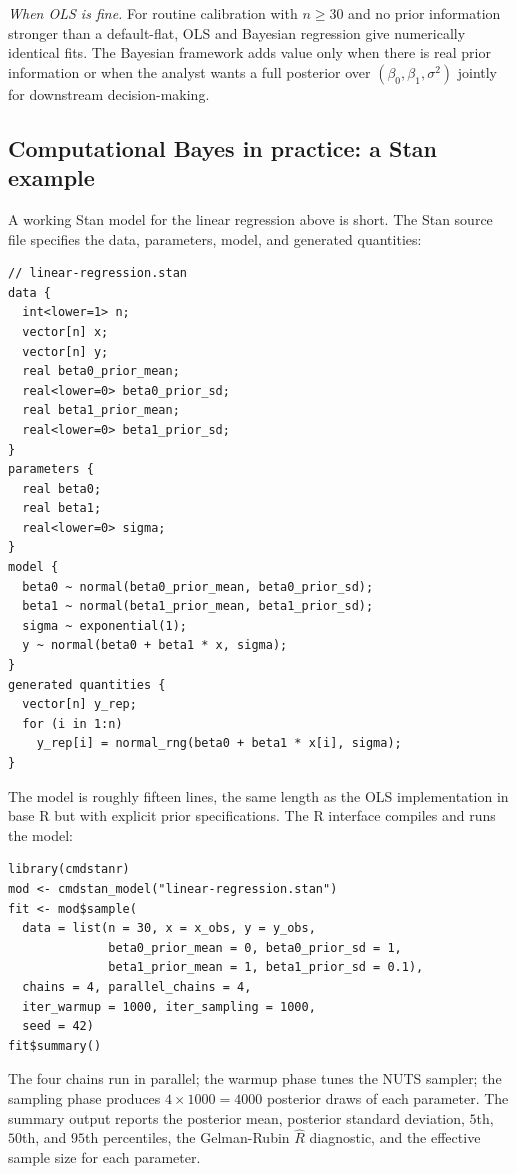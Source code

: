 \textit{When OLS is fine.} For routine calibration with $n \geq
30$ and no prior information stronger than a default-flat,
OLS and Bayesian regression give numerically identical fits.
The Bayesian framework adds value only when there is real prior
information or when the analyst wants a full posterior over
$(\beta_{0}, \beta_{1}, \sigma^{2})$ jointly for downstream
decision-making.

\subsection{Computational Bayes in practice: a Stan example}

A working Stan model for the linear regression above is short.
The Stan source file specifies the data, parameters, model, and
generated quantities:

\begin{verbatim}
// linear-regression.stan
data {
  int<lower=1> n;
  vector[n] x;
  vector[n] y;
  real beta0_prior_mean;
  real<lower=0> beta0_prior_sd;
  real beta1_prior_mean;
  real<lower=0> beta1_prior_sd;
}
parameters {
  real beta0;
  real beta1;
  real<lower=0> sigma;
}
model {
  beta0 ~ normal(beta0_prior_mean, beta0_prior_sd);
  beta1 ~ normal(beta1_prior_mean, beta1_prior_sd);
  sigma ~ exponential(1);
  y ~ normal(beta0 + beta1 * x, sigma);
}
generated quantities {
  vector[n] y_rep;
  for (i in 1:n)
    y_rep[i] = normal_rng(beta0 + beta1 * x[i], sigma);
}
\end{verbatim}

\noindent
The model is roughly fifteen lines, the same length as the OLS
implementation in base R but with explicit prior specifications.
The R interface compiles and runs the model:

\begin{verbatim}
library(cmdstanr)
mod <- cmdstan_model("linear-regression.stan")
fit <- mod$sample(
  data = list(n = 30, x = x_obs, y = y_obs,
              beta0_prior_mean = 0, beta0_prior_sd = 1,
              beta1_prior_mean = 1, beta1_prior_sd = 0.1),
  chains = 4, parallel_chains = 4,
  iter_warmup = 1000, iter_sampling = 1000,
  seed = 42)
fit$summary()
\end{verbatim}

\noindent
The four chains run in parallel; the warmup phase tunes the NUTS
sampler; the sampling phase produces $4 \times 1000 = 4000$
posterior draws of each parameter. The summary output reports the
posterior mean, posterior standard deviation, $5$th, $50$th, and
$95$th percentiles, the Gelman-Rubin $\hat{R}$ diagnostic, and the
effective sample size for each parameter.

